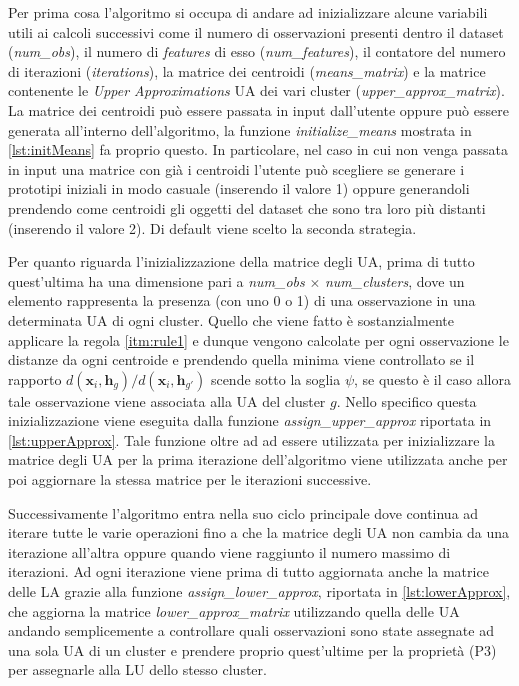 \documentclass[12pt]{article}
\begin{document}
Per prima cosa l'algoritmo si occupa di andare ad inizializzare alcune variabili utili ai calcoli successivi come il numero di osservazioni presenti dentro il dataset (\textit{num\_obs}), il numero di \textit{features} di esso (\textit{num\_features}), il contatore del numero di iterazioni (\textit{iterations}), la matrice dei centroidi (\textit{means\_matrix}) e la matrice contenente le \textit{Upper Approximations} UA dei vari cluster (\textit{upper\_approx\_matrix}).
La matrice dei centroidi può essere passata in input dall'utente oppure può essere generata all'interno dell'algoritmo, la funzione \textit{initialize\_means} mostrata in \ref{lst:initMeans} fa proprio questo. In particolare, nel caso in cui non venga passata in input una matrice con già i centroidi l'utente può scegliere se generare i prototipi iniziali in modo casuale (inserendo il valore 1) oppure generandoli prendendo come centroidi gli oggetti del dataset che sono tra loro più distanti (inserendo il valore 2). Di default viene scelto la seconda strategia.



Per quanto riguarda l'inizializzazione della matrice degli UA, prima di tutto quest'ultima ha una dimensione pari a \textit{num\_obs} $\times$ \textit{num\_clusters}, dove un elemento rappresenta la presenza (con uno 0 o 1) di una osservazione in una determinata UA di ogni cluster. Quello che viene fatto è sostanzialmente applicare la regola \ref{itm:rule1} e dunque vengono calcolate per ogni osservazione le distanze da ogni centroide e prendendo quella minima viene controllato se il rapporto $d(\mathbf{x}_i, \mathbf{h}_g) / d(\mathbf{x}_i, \mathbf{h}_{g'})$ scende sotto la soglia $\psi$, se questo è il caso allora tale osservazione viene associata alla UA del cluster $g$. Nello specifico questa inizializzazione viene eseguita dalla funzione \textit{assign\_upper\_approx} riportata in \ref{lst:upperApprox}. Tale funzione oltre ad ad essere utilizzata per inizializzare la matrice degli UA per la prima iterazione dell'algoritmo viene utilizzata anche per poi aggiornare la stessa matrice per le iterazioni successive.



Successivamente l'algoritmo entra nella suo ciclo principale dove continua ad iterare tutte le varie operazioni fino a che la matrice degli UA non cambia da una iterazione all'altra oppure quando viene raggiunto il numero massimo di iterazioni. Ad ogni iterazione viene prima di tutto aggiornata anche la matrice delle LA grazie alla funzione \textit{assign\_lower\_approx}, riportata in \ref{lst:lowerApprox}, che aggiorna la matrice \textit{lower\_approx\_matrix} utilizzando quella delle UA andando semplicemente a controllare quali osservazioni sono state assegnate ad una sola UA di un cluster e prendere proprio quest'ultime per la proprietà (P3) per assegnarle alla LU dello stesso cluster.
\end{document}
